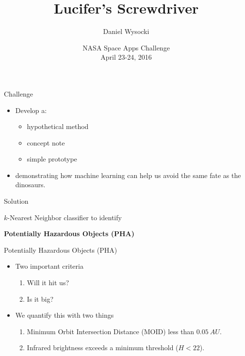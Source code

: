 \documentclass{beamer}
\title{Lucifer's Screwdriver}
\author{Daniel Wysocki}
\institute[RIT]{
  Rochester Institute of Technology
}
\date[04/24/2016]{
  NASA Space Apps Challenge
  \\
  April 23-24, 2016
}
\begin{document}
\maketitle

\begin{frame}{Challenge}

  \begin{itemize}
  \item Develop a:
    \begin{itemize}
    \item hypothetical method
    \item concept note
    \item simple prototype
    \end{itemize}
  \item demonstrating how machine learning can help us avoid the same
    fate as the dinosaurs.
  \end{itemize}

\end{frame}


\begin{frame}{Solution}

  \begin{center}
    $k$-Nearest Neighbor classifier to identify

    \vspace{0.25in}

    \textbf{Potentially Hazardous Objects (PHA)}
  \end{center}

\end{frame}


\begin{frame}{Potentially Hazardous Objects (PHA)}

  \begin{itemize}
  \item Two important criteria
    \begin{enumerate}
    \item Will it hit us?
    \item Is it big?
    \end{enumerate}
  \item We quantify this with two things
    \begin{enumerate}
    \item Minimum Orbit Intersection Distance (MOID) less than
      $\SI{0.05}{AU}$.
    \item Infrared brightness exceeds a minimum threshold ($H < 22$).
    \end{enumerate}
  \end{itemize}

\end{frame}
\end{document}
